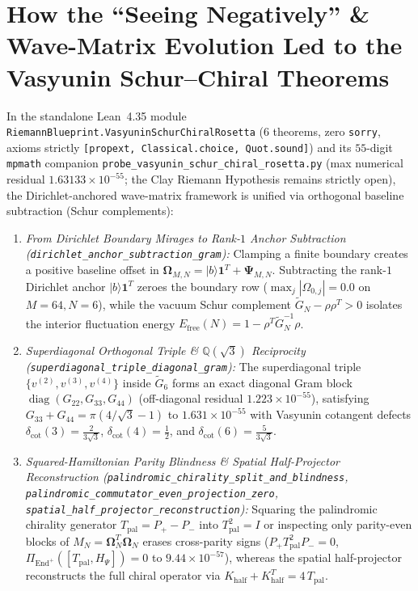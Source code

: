\documentclass[10pt,a4paper]{article}
\theoremstyle{definition}
\begin{document}
\section{How the ``Seeing Negatively'' \& Wave-Matrix Evolution Led to the Vasyunin Schur--Chiral Theorems}

In the standalone Lean~4.35 module \texttt{RiemannBlueprint.\allowbreak VasyuninSchurChiralRosetta} ($6$ theorems, zero \texttt{sorry}, axioms strictly \texttt{[propext, Classical.choice, Quot.sound]}) and its $55$-digit \texttt{mpmath} companion \texttt{probe\_vasyunin\_schur\_chiral\_rosetta.py} (max numerical residual $1.63133\times 10^{-55}$; the Clay Riemann Hypothesis remains strictly open), the Dirichlet-anchored wave-matrix framework is unified via orthogonal baseline subtraction (Schur complements):
\begin{enumerate}
\item \emph{From Dirichlet Boundary Mirages to Rank-$1$ Anchor Subtraction (\texttt{dirichlet\_anchor\_subtraction\_gram}):} Clamping a finite boundary creates a positive baseline offset in $\mathbf{\Omega}_{M,N} = |b\rangle\mathbf{1}^T + \mathbf{\Psi}_{M,N}$. Subtracting the rank-$1$ Dirichlet anchor $|b\rangle\mathbf{1}^T$ zeroes the boundary row ($\max_j |\Omega_{0,j}| = 0.0$ on $M=64, N=6$), while the vacuum Schur complement $\widetilde{G}_N - \rho\rho^T > 0$ isolates the interior fluctuation energy $E_{\mathrm{free}}(N) = 1 - \rho^T \widetilde{G}_N^{-1}\rho$.
\item \emph{Superdiagonal Orthogonal Triple \& $\mathbb{Q}(\sqrt{3})$ Reciprocity (\texttt{superdiagonal\_triple\_diagonal\_gram}):} The superdiagonal triple $\{v^{(2)}, v^{(3)}, v^{(4)}\}$ inside $\widetilde{G}_6$ forms an exact diagonal Gram block $\operatorname{diag}(G_{22}, G_{33}, G_{44})$ (off-diagonal residual $1.223\times 10^{-55}$), satisfying $G_{33} + G_{44} = \pi(4/\sqrt{3} - 1)$ to $1.631\times 10^{-55}$ with Vasyunin cotangent defects $\delta_{\cot}(3) = \frac{2}{3\sqrt{3}}$, $\delta_{\cot}(4) = \frac{1}{2}$, and $\delta_{\cot}(6) = \frac{5}{3\sqrt{3}}$.
\item \emph{Squared-Hamiltonian Parity Blindness \& Spatial Half-Projector Reconstruction (\texttt{palindromic\_chirality\_split\_and\_blindness}, \texttt{palindromic\_commutator\_even\_projection\_zero}, \texttt{spatial\_half\_projector\_reconstruction}):} Squaring the palindromic chirality generator $T_{\mathrm{pal}} = P_+ - P_-$ into $T_{\mathrm{pal}}^2 = I$ or inspecting only parity-even blocks of $M_N = \mathbf{\Omega}_N^T \mathbf{\Omega}_N$ erases cross-parity signs ($P_+ T_{\mathrm{pal}}^2 P_- = 0$, $\Pi_{\mathrm{End}^+}([T_{\mathrm{pal}}, H_\Psi]) = 0$ to $9.44\times 10^{-57}$), whereas the spatial half-projector reconstructs the full chiral operator via $K_{\mathrm{half}} + K_{\mathrm{half}}^T = 4\,T_{\mathrm{pal}}$.

\end{enumerate}
\end{document}
